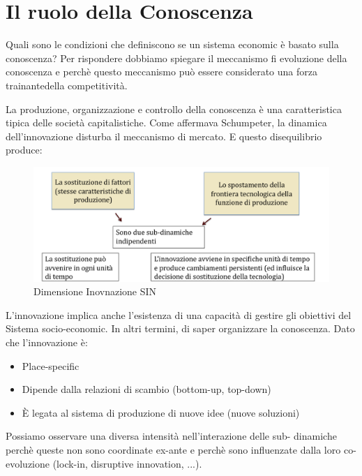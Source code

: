 \documentclass{article}
\begin{document}
\section{Il ruolo della Conoscenza }
Quali sono le condizioni che definiscono se un sistema economic è basato
sulla conoscenza?
Per rispondere dobbiamo spiegare il meccanismo fi evoluzione della
conoscenza e perchè questo meccanismo può essere considerato una
forza trainantedella competitività.

La produzione, organizzazione e controllo della conoscenza è una
caratteristica tipica delle società capitalistiche. Come affermava Schumpeter,
la dinamica dell’innovazione disturba il meccanismo di mercato.
E questo disequilibrio produce:


\begin{figure}[h!]
	\centering
	\includegraphics[scale=0.3]{images/dinInn.png}
	\caption{Dimensione Inovnazione SIN}
	\label{fig:Dim}
\end{figure} 




L’innovazione implica anche l’esistenza di una capacità di gestire gli
obiettivi del Sistema socio-economic. In altri termini, di saper
organizzare la conoscenza.
Dato che l’innovazione è:
\begin{itemize}
	\item Place-specific
	\item Dipende dalla relazioni di scambio (bottom-up, top-down)
	\item  È legata al sistema di produzione di nuove idee (nuove soluzioni)
\end{itemize}

Possiamo osservare una diversa intensità nell’interazione delle sub-
dinamiche perchè queste non sono coordinate ex-ante e perchè sono
influenzate dalla loro co-evoluzione (lock-in, disruptive innovation, ...).
\end{document}
